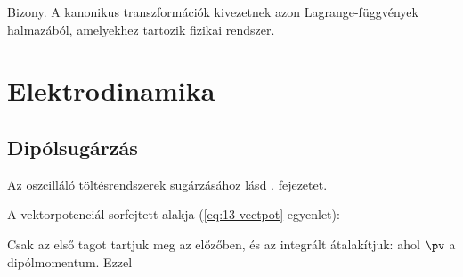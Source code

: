     Bizony.
   A kanonikus transzformációk kivezetnek azon Lagrange-függvények halmazából, amelyekhez tartozik fizikai rendszer. 

 \section{Elektrodinamika}
  
  \subsection{Dipólsugárzás}
   
   Az oszcilláló töltésrendszerek sugárzásához lásd . fejezetet.
   
   A vektorpotenciál sorfejtett alakja (\eqref{eq:13-vectpot} egyenlet):
   
   Csak az első tagot tartjuk meg az előzőben, és az integrált átalakítjuk:
   ahol $\pv$ a dipólmomentum.
   Ezzel
   

